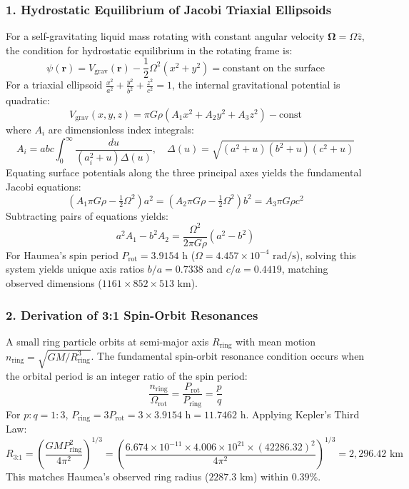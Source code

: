 \documentclass[11pt,a4paper]{article}
\begin{document}
\subsubsection*{1. Hydrostatic Equilibrium of Jacobi Triaxial Ellipsoids}
For a self-gravitating liquid mass rotating with constant angular velocity $\mathbf{\Omega} = \Omega \hat{z}$, the condition for hydrostatic equilibrium in the rotating frame is:
\begin{equation}
\psi(\mathbf{r}) = V_{\text{grav}}(\mathbf{r}) - \frac{1}{2} \Omega^2 (x^2 + y^2) = \text{constant on the surface}
\end{equation}
For a triaxial ellipsoid $\frac{x^2}{a^2} + \frac{y^2}{b^2} + \frac{z^2}{c^2} = 1$, the internal gravitational potential is quadratic:
\begin{equation}
V_{\text{grav}}(x,y,z) = \pi G \rho (A_1 x^2 + A_2 y^2 + A_3 z^2) - \text{const}
\end{equation}
where $A_i$ are dimensionless index integrals:
\begin{equation}
A_i = a b c \int_0^\infty \frac{du}{(a_i^2 + u) \Delta(u)}, \quad \Delta(u) = \sqrt{(a^2+u)(b^2+u)(c^2+u)}
\end{equation}
Equating surface potentials along the three principal axes yields the fundamental Jacobi equations:
\begin{equation}
(A_1 \pi G \rho - \tfrac{1}{2}\Omega^2) a^2 = (A_2 \pi G \rho - \tfrac{1}{2}\Omega^2) b^2 = A_3 \pi G \rho c^2
\end{equation}
Subtracting pairs of equations yields:
\begin{equation}
a^2 A_1 - b^2 A_2 = \frac{\Omega^2}{2\pi G \rho} (a^2 - b^2)
\end{equation}
For Haumea's spin period $P_{\text{rot}} = 3.9154\text{ h}$ ($\Omega = 4.457 \times 10^{-4}\text{ rad/s}$), solving this system yields unique axis ratios $b/a = 0.7338$ and $c/a = 0.4419$, matching observed dimensions ($1161 \times 852 \times 513\text{ km}$).

\subsubsection*{2. Derivation of 3:1 Spin-Orbit Resonances}
A small ring particle orbits at semi-major axis $R_{\text{ring}}$ with mean motion $n_{\text{ring}} = \sqrt{GM/R_{\text{ring}}^3}$. The fundamental spin-orbit resonance condition occurs when the orbital period is an integer ratio of the spin period:
\begin{equation}
\frac{n_{\text{ring}}}{\Omega_{\text{rot}}} = \frac{P_{\text{rot}}}{P_{\text{ring}}} = \frac{p}{q}
\end{equation}
For $p:q = 1:3$, $P_{\text{ring}} = 3 P_{\text{rot}} = 3 \times 3.9154\text{ h} = 11.7462\text{ h}$.
Applying Kepler's Third Law:
\begin{equation}
R_{\text{3:1}} = \left( \frac{G M P_{\text{ring}}^2}{4\pi^2} \right)^{1/3} = \left( \frac{6.674 \times 10^{-11} \times 4.006 \times 10^{21} \times (42286.32)^2}{4\pi^2} \right)^{1/3} = 2,296.42\text{ km}
\end{equation}
This matches Haumea's observed ring radius ($2287.3\text{ km}$) within $0.39\%$.
\end{document}
